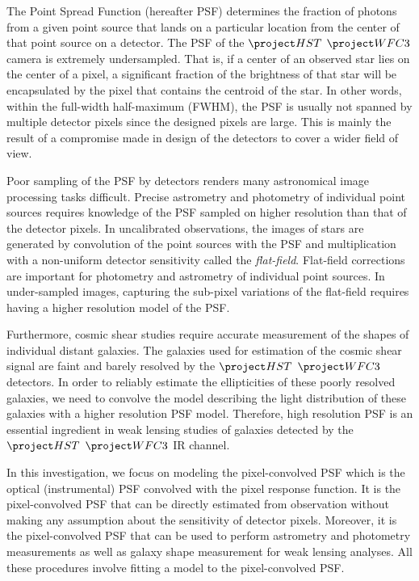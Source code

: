 The Point Spread Function (hereafter PSF) determines the fraction of photons from a given point source that lands on a particular location 
from the center of that point source on a detector. The PSF of the $\hst$ $\wfc$ camera is extremely undersampled. That is, if a center of an observed star lies 
on the center of a pixel, a significant fraction of the brightness of that star will be 
encapsulated by the pixel that contains the centroid of the star.
In other words, within the full-width half-maximum (FWHM), the PSF is usually not spanned by multiple detector pixels since the designed 
pixels are large. This is mainly the result of a compromise made in design of the detectors to cover a wider field of view.

Poor sampling of the PSF by detectors renders many astronomical image processing tasks difficult. Precise astrometry and photometry 
of individual point sources requires knowledge of the PSF sampled on higher resolution than that of the detector pixels. 
In uncalibrated observations, the images of stars are generated by convolution of the point sources with the PSF and multiplication 
with a non-uniform detector sensitivity called the \emph{flat-field}. Flat-field corrections are important for photometry and astrometry of 
individual point sources. In under-sampled images, capturing the sub-pixel variations of the flat-field requires having a higher resolution 
model of the PSF. 

Furthermore, cosmic shear studies require accurate measurement of the shapes of individual distant galaxies. The galaxies used for estimation 
of the cosmic shear signal are faint and barely resolved by the $\hst$ $\wfc$ detectors. In order to reliably estimate the ellipticities of these poorly 
resolved galaxies, we need to convolve the model describing the light distribution of these galaxies with a higher resolution PSF model. 
Therefore, high resolution PSF is an essential ingredient in weak lensing studies of galaxies detected by the $\hst$ $\wfc$ IR 
channel.   

In this investigation, we focus on modeling the pixel-convolved PSF which is the optical (instrumental) PSF convolved with the 
pixel response function. It is the pixel-convolved PSF that can be directly estimated from observation without making any assumption 
about the sensitivity of detector pixels. Moreover, it is the pixel-convolved PSF that can be used to perform astrometry and photometry measurements as well as 
galaxy shape measurement for weak lensing analyses. All these procedures involve fitting a model to the pixel-convolved PSF. 

